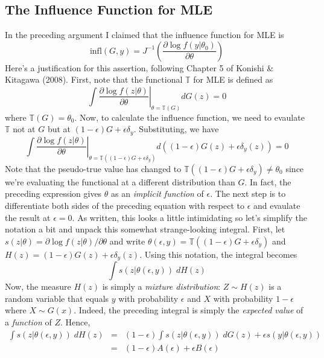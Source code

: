 \subsection{The Influence Function for MLE}
In the preceding argument I claimed that the influence function for MLE is 
	$$\mbox{infl}(G,y) = J^{-1} \left(\frac{\partial \log f(y|\theta_0)}{\partial \theta}\right)$$
  Here's a justification for this assertion, following Chapter 5 of Konishi \& Kitagawa (2008).
First, note that the functional $\mathbb{T}$ for MLE is defined as
$$\int\left.\frac{\partial\log f\left(z|\theta\right)}{\partial\theta}\right|_{\theta=\mathbb{T}\left(G\right)}dG\left(z\right)=0$$
where $\mathbb{T}\left(G\right)=\theta_{0}$. 
Now, to calculate the influence function, we need to evaulate $\mathbb{T}$ not at $G$ but at $\left(1-\epsilon\right)G+\epsilon\delta_{y}$. 
Substituting, we have
$$\int\left.\frac{\partial\log f\left(z|\theta\right)}{\partial\theta}\right|_{\theta=\mathbb{T}\left(\left(1-\epsilon\right)G+\epsilon\delta_{y}\right)}d\left(\left(1-\epsilon\right)G\left(z\right)+\epsilon\delta_{y}\left(z\right)\right)=0$$
Note that the pseudo-true value has changed to $\mathbb{T}(\left(1-\epsilon\right)G+\epsilon\delta_{y}) \neq \theta_0$ since we're evaluating the functional at a different distribution than $G$. In fact, the preceding expression gives $\theta$ as an \emph{implicit function} of $\epsilon$. The next step is to differentiate both sides of the preceding equation with respect to $\epsilon$ and evaulate the result at $\epsilon = 0$. As written, this looks a little intimidating so let's simplify the notation a bit and unpack this somewhat strange-looking integral. First, let $s(z| \theta) = \partial \log f(z|\theta)/\partial \theta$ and write $\theta(\epsilon,y) = \mathbb{T}(\left(1-\epsilon\right)G+\epsilon\delta_{y})$ and $H(z) = \left(1-\epsilon\right)G\left(z\right)+\epsilon\delta_{y}\left(z\right)$. Using this notation, the integral becomes
	$$\int s(z|\theta(\epsilon,y))\; dH(z)$$
Now, the measure $H(z)$ is simply a \emph{mixture distribution}: $Z \sim H(z)$ is a random variable that equals $y$ with probability $\epsilon$ and $X$ with probability $1-\epsilon$ where $X \sim G(x)$. Indeed, the preceding integral is simply the \emph{expected value} of a \emph{function} of $Z$. Hence,
\begin{eqnarray*}
	\int s(z|\theta(\epsilon,y))\; dH(z) &=& (1-\epsilon)\int s(z|\theta(\epsilon,y))\; dG(z) + \epsilon s(y|\theta(\epsilon,y))\\
		&=& (1-\epsilon) A(\epsilon) + \epsilon B(\epsilon)
\end{eqnarray*}
